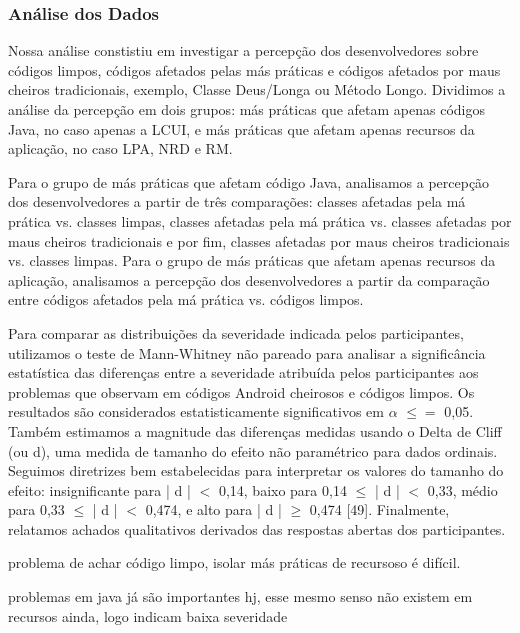 \subsubsection{Análise dos Dados}
\label{sub:perception-participants-analysis}

Nossa análise constistiu em investigar a percepção dos desenvolvedores sobre códigos limpos, códigos afetados pelas más práticas e códigos afetados por maus cheiros tradicionais, exemplo, Classe Deus/Longa ou Método Longo. Dividimos a análise da percepção em dois grupos: más práticas que afetam apenas códigos Java, no caso apenas a LCUI, e más práticas que afetam apenas recursos da aplicação, no caso LPA, NRD e RM.

Para o grupo de más práticas que afetam código Java, analisamos a percepção dos desenvolvedores a partir de três comparações: classes afetadas pela má prática vs. classes limpas, classes afetadas pela má prática vs. classes afetadas por maus cheiros tradicionais e por fim, classes afetadas por maus cheiros tradicionais vs. classes limpas. Para o grupo de más práticas que afetam apenas recursos da aplicação, analisamos a percepção dos desenvolvedores a partir da comparação entre códigos afetados pela má prática vs. códigos limpos.

Para comparar as distribuições da severidade indicada pelos participantes, utilizamos o teste de Mann-Whitney não pareado \cite{Conover1999} para analisar a significância estatística das diferenças entre a severidade atribuída pelos participantes aos problemas que observam em códigos Android cheirosos e códigos limpos. Os resultados são considerados estatisticamente significativos em $\alpha$ $\leq{=}$ 0,05. Também estimamos a magnitude das diferenças medidas usando o Delta de Cliff (ou d), uma medida de tamanho do efeito não paramétrico \cite{GrissomKim2005} para dados ordinais. Seguimos diretrizes bem estabelecidas para interpretar os valores do tamanho do efeito: insignificante para | d | $<$ 0,14, baixo para 0,14 $\leq$ | d | $<$ 0,33, médio para 0,33 $\leq$ | d | $<$ 0,474, e alto para | d | $\geq$ 0,474 [49]. Finalmente, relatamos achados qualitativos derivados das respostas abertas dos participantes.









problema de achar código limpo, isolar más práticas de recursoso é difícil.

problemas em java já são importantes hj, esse mesmo senso não existem em recursos ainda, logo indicam baixa severidade







